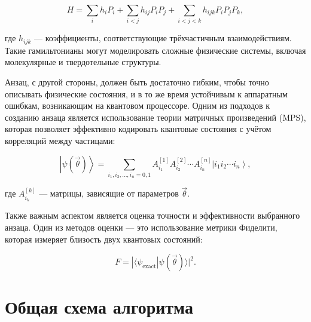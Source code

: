 \documentclass[a4paper]{report}
\newcommand{\ket}[1] {{\ensuremath{\left|#1\right\rangle}}}
\begin{document}
\begin{equation}
H = \sum_i h_i P_i + \sum_{i<j} h_{ij} P_i P_j + \sum_{i<j<k} h_{ijk} P_i P_j P_k,
\end{equation}

где $h_{ijk}$ — коэффициенты, соответствующие трёхчастичным взаимодействиям. Такие гамильтонианы могут моделировать сложные физические системы, включая молекулярные и твердотельные структуры.

Анзац, с другой стороны, должен быть достаточно гибким, чтобы точно описывать физические состояния, и в то же время устойчивым к аппаратным ошибкам, возникающим на квантовом процессоре. Одним из подходов к созданию анзаца является использование теории матричных произведений (MPS), которая позволяет эффективно кодировать квантовые состояния с учётом корреляций между частицами:

\begin{equation}
\ket{\psi(\vec{\theta})} = \sum_{i_1, i_2, \ldots, i_n = 0, 1} A^{[1]}_{i_1} A^{[2]}_{i_2} \cdots A^{[n]}_{i_n} \ket{i_1 i_2 \cdots i_n},
\end{equation}

где $A^{[k]}_{i_k}$ — матрицы, зависящие от параметров $\vec{\theta}$.

Также важным аспектом является оценка точности и эффективности выбранного анзаца. Один из методов оценки — это использование метрики Фиделити, которая измеряет близость двух квантовых состояний:

\begin{equation}
F = |\langle \psi_{\text{exact}} | \psi(\vec{\theta}) \rangle|^2.
\end{equation}


\section{Общая схема алгоритма}
\end{document}
